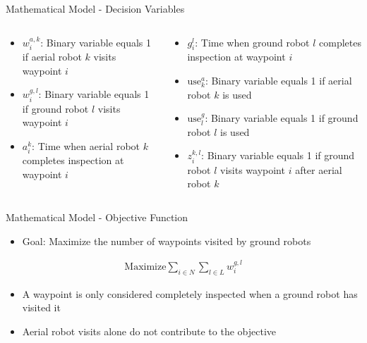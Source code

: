 \documentclass[aspectratio=169,11pt,xcolor={dvipsnames},hyperref={pdftex,pdfpagemode=UseNone,hidelinks,pdfdisplaydoctitle=true},usepdftitle=false]{beamer}
\begin{document}
  \begin{frame}{Mathematical Model - Decision Variables}
    \begin{columns}[c]
      \begin{column}{0.48\textwidth}
        \begin{itemize}
          \item $w_i^{a,k}$: Binary variable equals 1 if aerial robot $k$ visits waypoint $i$
          \item $w_i^{g,l}$: Binary variable equals 1 if ground robot $l$ visits waypoint $i$
          \item $a_i^k$: Time when aerial robot $k$ completes inspection at waypoint $i$
        \end{itemize}
      \end{column}
      \begin{column}{0.48\textwidth}
        \begin{itemize}
          \item $g_i^l$: Time when ground robot $l$ completes inspection at waypoint $i$
          \item $\text{use}_k^a$: Binary variable equals 1 if aerial robot $k$ is used
          \item $\text{use}_l^g$: Binary variable equals 1 if ground robot $l$ is used
          \item $z_i^{k,l}$: Binary variable equals 1 if ground robot $l$ visits waypoint $i$ after aerial robot $k$
        \end{itemize}
      \end{column}
    \end{columns}
  \end{frame}

  \begin{frame}{Mathematical Model - Objective Function}
    \begin{itemize}
      \item Goal: Maximize the number of waypoints visited by ground robots
    \end{itemize}
    \begin{align}
      \text{Maximize} \sum_{i \in N}\sum_{l \in L} w_i^{g,l}
    \end{align}
    \begin{itemize}
      \item A waypoint is only considered completely inspected when a ground robot has visited it
      \item Aerial robot visits alone do not contribute to the objective
    \end{itemize}
  \end{frame}
\end{document}
